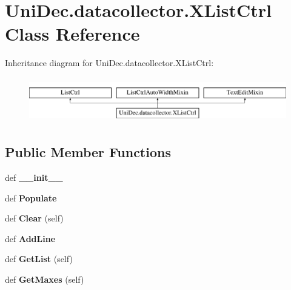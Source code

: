 \hypertarget{class_uni_dec_1_1datacollector_1_1_x_list_ctrl}{}\section{Uni\+Dec.\+datacollector.\+X\+List\+Ctrl Class Reference}
\label{class_uni_dec_1_1datacollector_1_1_x_list_ctrl}
Inheritance diagram for Uni\+Dec.\+datacollector.\+X\+List\+Ctrl\+:\begin{figure}[H]
\begin{center}
\leavevmode
\includegraphics[height=1.964912cm]{class_uni_dec_1_1datacollector_1_1_x_list_ctrl}
\end{center}
\end{figure}
\subsection*{Public Member Functions}
\begin{DoxyCompactItemize}
\item 
\hypertarget{class_uni_dec_1_1datacollector_1_1_x_list_ctrl_ab420e1301526e454d0ef9561042ac496}{}def {\bfseries \+\_\+\+\_\+init\+\_\+\+\_\+}\label{class_uni_dec_1_1datacollector_1_1_x_list_ctrl_ab420e1301526e454d0ef9561042ac496}

\item 
\hypertarget{class_uni_dec_1_1datacollector_1_1_x_list_ctrl_aee891d7aee7e25377ffee57dfc88bb42}{}def {\bfseries Populate}\label{class_uni_dec_1_1datacollector_1_1_x_list_ctrl_aee891d7aee7e25377ffee57dfc88bb42}

\item 
\hypertarget{class_uni_dec_1_1datacollector_1_1_x_list_ctrl_a0c1ac658d2bf784aa8f055f0c7a34c90}{}def {\bfseries Clear} (self)\label{class_uni_dec_1_1datacollector_1_1_x_list_ctrl_a0c1ac658d2bf784aa8f055f0c7a34c90}

\item 
\hypertarget{class_uni_dec_1_1datacollector_1_1_x_list_ctrl_a9d8800bb81ca766014f106ecb5c341af}{}def {\bfseries Add\+Line}\label{class_uni_dec_1_1datacollector_1_1_x_list_ctrl_a9d8800bb81ca766014f106ecb5c341af}

\item 
\hypertarget{class_uni_dec_1_1datacollector_1_1_x_list_ctrl_ab012a877ccd7a03f526526a14c83dbd6}{}def {\bfseries Get\+List} (self)\label{class_uni_dec_1_1datacollector_1_1_x_list_ctrl_ab012a877ccd7a03f526526a14c83dbd6}

\item 
\hypertarget{class_uni_dec_1_1datacollector_1_1_x_list_ctrl_a26f996cb505c6b9dfddb2458c1cdf608}{}def {\bfseries Get\+Maxes} (self)\label{class_uni_dec_1_1datacollector_1_1_x_list_ctrl_a26f996cb505c6b9dfddb2458c1cdf608}

\end{DoxyCompactItemize}
